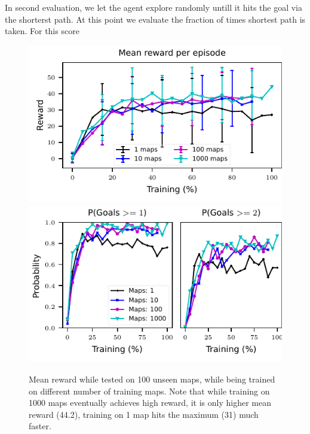 \begin{description}
\begin{description}
        In second evaluation, we let the agent explore randomly untill it hits the goal via the shorterst path.
        At this point we evaluate the  fraction of times shortest path is taken. For this score 


    \end{description}
\end{description}

\begin{figure}%
 \vspace{-3em}%
\includegraphics[width=0.5\columnwidth]{images/plot_reward_3D-1000.pdf}%
\includegraphics[width=0.5\columnwidth]{images/plot_probability_3D-1000.pdf}%
\vspace{-1em}%
\caption{Mean reward while tested on 100 unseen maps, while being trained on different number of training maps. Note that while training on 1000 maps eventually achieves high reward, it is only higher mean reward (44.2), training on 1 map hits the maximum (31) much faster.}%
\label{fig:plot_reward_on_testing}%
\end{figure}
